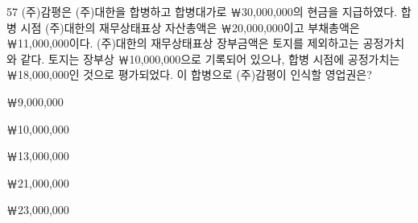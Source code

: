 \begin{question}{57}
(주)감평은 (주)대한을 합병하고 합병대가로 ￦30,000,000의 현금을 지급하였다. 합병 시점 (주)대한의 재무상태표상 자산총액은 ￦20,000,000이고 부채총액은 ￦11,000,000이다. (주)대한의 재무상태표상 장부금액은 토지를 제외하고는 공정가치와 같다. 토지는 장부상 ￦10,000,000으로 기록되어 있으나, 합병 시점에 공정가치는 ￦18,000,000인 것으로 평가되었다. 이 합병으로 (주)감평이 인식할 영업권은?
\begin{choices}
  \item ￦9,000,000
  \item ￦10,000,000
  \item ￦13,000,000
  \item ￦21,000,000
  \item ￦23,000,000
\end{choices}
\end{question}
